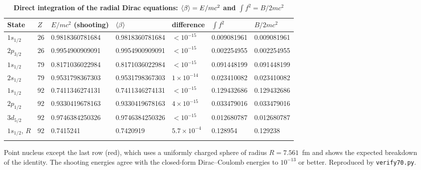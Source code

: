 \documentclass[%
 reprint, amsmath,amssymb, aps, prb, ]{revtex4-2}
\numberwithin{equation}{section}
\begin{document}
\begin{table}[t!]
\centering
\caption{\textbf{Direct integration of the radial Dirac equations: $\expval{\beta} = E/mc^{2}$ and $\int f^{2} = B/2mc^{2}$}}
\label{tab:theorem}
\renewcommand{\arraystretch}{1.4}
\begin{tabular}{p{1.6cm}p{0.9cm}p{3.1cm}p{3.1cm}p{1.9cm}p{2.2cm}p{2.2cm}}
\toprule
\textbf{State} & \textbf{$Z$} & \textbf{$E/mc^{2}$ (shooting)} & \textbf{$\expval{\beta}$} & \textbf{difference} & \textbf{$\int f^{2}$} & \textbf{$B/2mc^{2}$} \\
\midrule
$1s_{1/2}$ & 26 & 0.9818360781684 & 0.9818360781684 & $<10^{-15}$ & 0.009081961 & 0.009081961 \\
\addlinespace[0.3cm]
$2p_{3/2}$ & 26 & 0.9954900909091 & 0.9954900909091 & $<10^{-15}$ & 0.002254955 & 0.002254955 \\
\addlinespace[0.3cm]
$1s_{1/2}$ & 79 & 0.8171036022984 & 0.8171036022984 & $<10^{-15}$ & 0.091448199 & 0.091448199 \\
\addlinespace[0.3cm]
$2s_{1/2}$ & 79 & 0.9531798367303 & 0.9531798367303 & $1\times10^{-14}$ & 0.023410082 & 0.023410082 \\
\addlinespace[0.3cm]
$1s_{1/2}$ & 92 & 0.7411346274131 & 0.7411346274131 & $<10^{-15}$ & 0.129432686 & 0.129432686 \\
\addlinespace[0.3cm]
$2p_{1/2}$ & 92 & 0.9330419678163 & 0.9330419678163 & $4\times10^{-15}$ & 0.033479016 & 0.033479016 \\
\addlinespace[0.3cm]
$3d_{5/2}$ & 92 & 0.9746384250326 & 0.9746384250326 & $<10^{-15}$ & 0.012680787 & 0.012680787 \\
\addlinespace[0.3cm]
\textcolor{fail}{$1s_{1/2}$, $R$} & \textcolor{fail}{92} & \textcolor{fail}{0.7415241} & \textcolor{fail}{0.7420919} & \textcolor{fail}{$5.7\times10^{-4}$} & \textcolor{fail}{0.128954} & \textcolor{fail}{0.129238} \\
\addlinespace[0.2cm]
\bottomrule
\end{tabular}
\vspace{0.2cm}
\begin{minipage}{0.95\textwidth}
\justifying\footnotesize
Point nucleus except the last row (red), which uses a uniformly charged sphere of radius $R = 7.561$~fm and shows the expected breakdown of the identity. The shooting energies agree with the closed-form Dirac--Coulomb energies to $10^{-13}$ or better. Reproduced by \texttt{verify70.py}.
\end{minipage}
\end{table}
\end{document}
